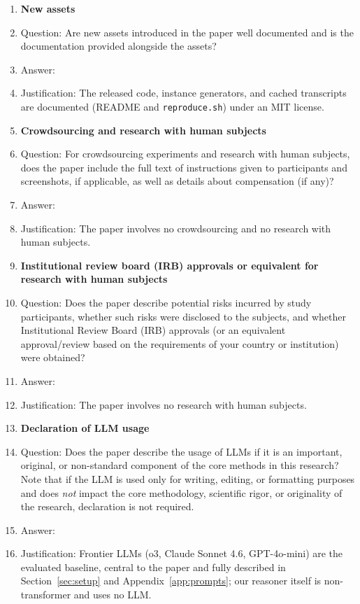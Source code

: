 \begin{enumerate}
\item {\bf New assets}
    \item[] Question: Are new assets introduced in the paper well documented and is the documentation provided alongside the assets?
    \item[] Answer: \answerYes{}
    \item[] Justification: The released code, instance generators, and cached transcripts are documented (README and \texttt{reproduce.sh}) under an MIT license.

\item {\bf Crowdsourcing and research with human subjects}
    \item[] Question: For crowdsourcing experiments and research with human subjects, does the paper include the full text of instructions given to participants and screenshots, if applicable, as well as details about compensation (if any)?
    \item[] Answer: \answerNA{}
    \item[] Justification: The paper involves no crowdsourcing and no research with human subjects.

\item {\bf Institutional review board (IRB) approvals or equivalent for research with human subjects}
    \item[] Question: Does the paper describe potential risks incurred by study participants, whether such risks were disclosed to the subjects, and whether Institutional Review Board (IRB) approvals (or an equivalent approval/review based on the requirements of your country or institution) were obtained?
    \item[] Answer: \answerNA{}
    \item[] Justification: The paper involves no research with human subjects.

\item {\bf Declaration of LLM usage}
    \item[] Question: Does the paper describe the usage of LLMs if it is an important, original, or non-standard component of the core methods in this research? Note that if the LLM is used only for writing, editing, or formatting purposes and does \emph{not} impact the core methodology, scientific rigor, or originality of the research, declaration is not required.
    \item[] Answer: \answerYes{}
    \item[] Justification: Frontier LLMs (o3, Claude Sonnet 4.6, GPT-4o-mini) are the evaluated baseline, central to the paper and fully described in Section~\ref{sec:setup} and Appendix~\ref{app:prompts}; our reasoner itself is non-transformer and uses no LLM.

\end{enumerate}
